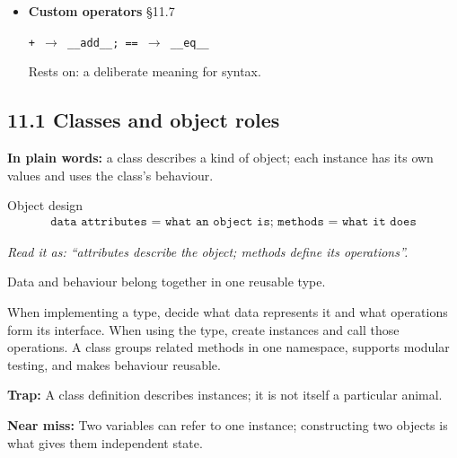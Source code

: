 \documentclass[11pt]{article}
\begin{document}
\begin{keepsection}
\begin{itemize}
\texttt{shared counter \ensuremath{\to} per-object ID}

Rests on: class-wide shared state.
\item {}
\textbf{Custom operators} \hfill{\small\color{FAUblue}§11.7}

\texttt{+ \ensuremath{\to} \_\_add\_\_; == \ensuremath{\to} \_\_eq\_\_}

Rests on: a deliberate meaning for syntax.
\end{itemize}
\end{keepsection}

\begin{keepsection}
\section{11.1 Classes and object roles}

\begin{plainbox}\textbf{In plain words:} a class describes a kind of object; each instance has its own values and uses the class’s behaviour.\end{plainbox}

\begin{equationcard}{Object design}
\[ \begin{gathered} \texttt{data attributes = what an object is; methods = what it does} \end{gathered} \]
{\small \emph{Read it as: “attributes describe the object; methods define its operations”.}\par Data and behaviour belong together in one reusable type.}
\end{equationcard}

When implementing a type, decide what data represents it and what operations form its interface. When using the type, create instances and call those operations. A class groups related methods in one namespace, supports modular testing, and makes behaviour reusable.

\begin{notebox}\textbf{Trap:} A class definition describes instances; it is not itself a particular animal.\end{notebox}

\begin{notebox}\textbf{Near miss:} Two variables can refer to one instance; constructing two objects is what gives them independent state.\end{notebox}


\end{keepsection}
\end{document}
